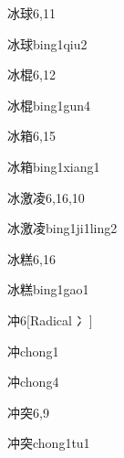 \begin{entry}{冰球}{6,11}
  \begin{phonetics}{冰球}{bing1qiu2}
  \end{phonetics}
\end{entry}

\begin{entry}{冰棍}{6,12}
  \begin{phonetics}{冰棍}{bing1gun4}
  \end{phonetics}
\end{entry}

\begin{entry}{冰箱}{6,15}
  \begin{phonetics}{冰箱}{bing1xiang1}
  \end{phonetics}
\end{entry}

\begin{entry}{冰激凌}{6,16,10}
  \begin{phonetics}{冰激凌}{bing1ji1ling2}
  \end{phonetics}
\end{entry}

\begin{entry}{冰糕}{6,16}
  \begin{phonetics}{冰糕}{bing1gao1}
  \end{phonetics}
\end{entry}

\begin{entry}{冲}{6}[Radical ⼎]
  \begin{phonetics}{冲}{chong1}
  \end{phonetics}
  \begin{phonetics}{冲}{chong4}
  \end{phonetics}
\end{entry}

\begin{entry}{冲突}{6,9}
  \begin{phonetics}{冲突}{chong1tu1}
  \end{phonetics}
\end{entry}

